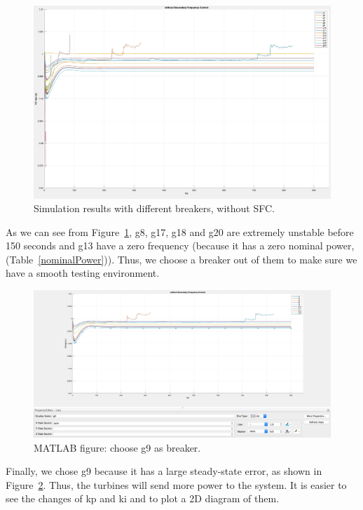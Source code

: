 \begin{figure}[htbp]
\centering
\includegraphics[width = .891\textwidth]{figure/4_1_1_without1.jpeg}
\caption{Simulation results with different breakers, without SFC.}
\label{4_1_1_without1}
\end{figure}

As we can see from Figure~\ref{4_1_1_without1}, g8, g17, g18 and g20 are extremely unstable before 150 seconds and g13 have a zero frequency (because it has a zero nominal power, (Table~\ref{nominalPower})). Thus, we choose a breaker out of them to make sure we have a smooth testing environment. \\


\begin{figure}[htbp]
\centering
\includegraphics[width = .891\textwidth]{figure/4_1_1_without2.jpeg}
\caption{MATLAB figure: choose g9 as breaker.}
\label{4_1_1_without2}
\end{figure}

Finally, we chose g9 because it has a large steady-state error, as shown in Figure~\ref{4_1_1_without2}. Thus, the turbines will send more power to the system. It is easier to see the changes of kp and ki and to plot a 2D diagram of them.

